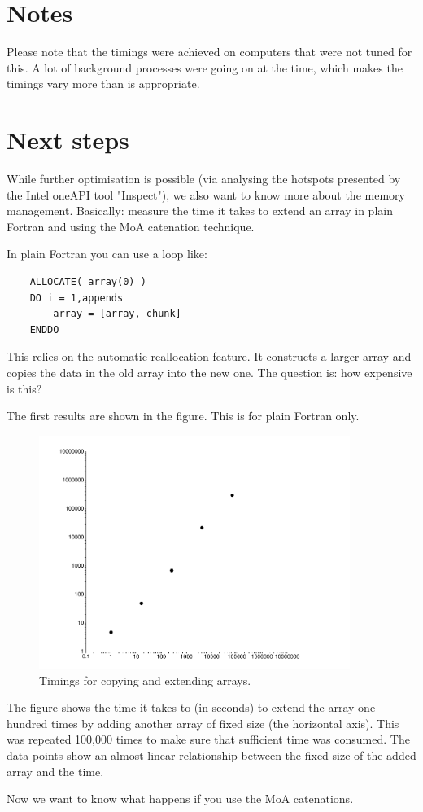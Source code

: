 \documentclass[onecolumn]{article}
\begin{document}
\section{Notes}
Please note that the timings were achieved on computers that were not tuned for this. A lot of background
processes were going on at the time, which makes the timings vary more than is appropriate.

\section{Next steps}
While further optimisation is possible (via analysing the hotspots presented by the Intel oneAPI tool "Inspect"), we
also want to know more about the memory management. Basically: measure the time it takes to extend an array
in plain Fortran and using the MoA catenation technique.

In plain Fortran you can use a loop like:

\begin{verbatim}
    ALLOCATE( array(0) )
    DO i = 1,appends
        array = [array, chunk]
    ENDDO
\end{verbatim}

This relies on the automatic reallocation feature. It constructs a larger array and copies the data in the old array
into the new one. The question is: how expensive is this?

The first results are shown in the figure. This is for plain Fortran only.

\begin{figure}
\includegraphics[width=0.9\textwidth]{copy_extend.pdf}
\caption{Timings for copying and extending arrays.}
\end{figure}

The figure shows the time it takes to (in seconds) to extend the array one hundred times by adding another array of
fixed size (the horizontal axis). This was repeated 100,000 times to make sure that sufficient time was consumed.
The data points show an almost linear relationship between the fixed size of the added array and the time.

Now we want to know what happens if you use the MoA catenations.
\end{document}
